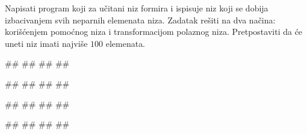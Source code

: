 \begin{Exercise}[label=p.izbacivanje_elemenata] 
Napisati program koji za učitani niz formira i ispisuje niz koji se dobija izbacivanjem svih neparnih elemenata niza. Zadatak rešiti na dva načina: korišćenjem pomoćnog niza i transformacijom polaznog niza. Pretpostaviti da će uneti niz imati najviše $100$ elemenata.  %
 
\begin{miditest}
\begin{upotreba}{1}
#\naslovInt#
##
##
##
\end{upotreba}
\end{miditest}
\begin{miditest}
\begin{upotreba}{2}
#\naslovInt#
##
##
##
\end{upotreba}
\end{miditest}

\begin{miditest}
\begin{upotreba}{3}
#\naslovInt#
##
##
#\izlaz{}#
\end{upotreba}
\end{miditest}

\begin{maxitest}
\begin{upotreba}{4}
#\naslovInt#
##
##
##
\end{upotreba}
\end{maxitest}
\end{Exercise}
\begin{Answer}[ref=p.izbacivanje_elemenata]
\end{Answer}

